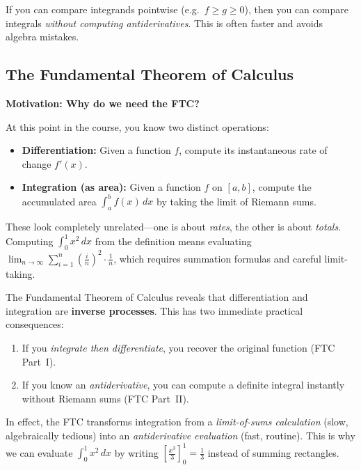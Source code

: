 \begin{examtip}[title={Exam Focus: Fast integral comparisons}]
If you can compare integrands pointwise (e.g.\ $f\ge g\ge 0$), then you can compare integrals \emph{without computing antiderivatives}. This is often faster and avoids algebra mistakes.
\end{examtip}

\subsection{The Fundamental Theorem of Calculus}

\textbf{Motivation: Why do we need the FTC?}

At this point in the course, you know two distinct operations:
\begin{itemize}[leftmargin=*]
\item \textbf{Differentiation:} Given a function $f$, compute its instantaneous rate of change $f'(x)$.
\item \textbf{Integration (as area):} Given a function $f$ on $[a,b]$, compute the accumulated area $\int_a^b f(x)\,dx$ by taking the limit of Riemann sums.
\end{itemize}

These look completely unrelated---one is about \emph{rates}, the other is about \emph{totals}. Computing $\int_0^1 x^2\,dx$ from the definition means evaluating $\displaystyle \lim_{n\to\infty}\sum_{i=1}^n \left(\frac{i}{n}\right)^2\cdot\frac{1}{n}$, which requires summation formulas and careful limit-taking.

The Fundamental Theorem of Calculus reveals that differentiation and integration are \textbf{inverse processes}. This has two immediate practical consequences:
\begin{enumerate}[label=(\roman*), leftmargin=*]
\item If you \emph{integrate then differentiate}, you recover the original function (FTC Part~I).
\item If you know an \emph{antiderivative}, you can compute a definite integral instantly without Riemann sums (FTC Part~II).
\end{enumerate}

In effect, the FTC transforms integration from a \emph{limit-of-sums calculation} (slow, algebraically tedious) into an \emph{antiderivative evaluation} (fast, routine). This is why we can evaluate $\int_0^1 x^2\,dx$ by writing $\left[\tfrac{x^3}{3}\right]_0^1 = \tfrac{1}{3}$ instead of summing rectangles.

